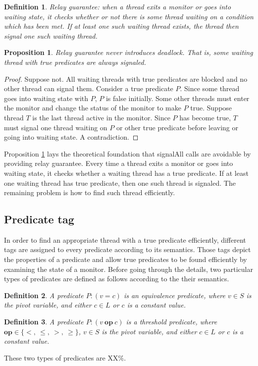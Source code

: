 \documentclass[preprint]{sigplanconf}
\newtheorem{definition}{Definition}
\newtheorem{proposition}{Proposition}
\begin{document}
\begin{definition}{Relay guarantee:}
    when a thread exits a monitor or goes into waiting state, it checks whether
    or not there is some thread waiting on a condition which has been met. If
    at least one such waiting thread exists, the thread then signal one such
    waiting thread.
\end{definition}
\begin{proposition} \label{pro:one}
    Relay guarantee never introduces deadlock. That is,
    some waiting thread with true predicates are always signaled. 
\end{proposition}
\begin{proof}
    Suppose not. All waiting threads with true predicates are blocked and 
    no other thread can signal them. Consider a true predicate $P$. Since some
    thread goes into waiting state with $P$, $P$ is false initially. Some 
    other threads must enter the monitor and change the status of the monitor 
    to make $P$ true. Suppose thread $T$ is the last thread active 
    in the monitor. Since $P$ has become true, $T$ must signal one thread
    waiting on $P$ or other true predicate before leaving or 
    going into waiting state. A contradiction. 
 \end{proof}

Proposition \ref{pro:one} lays the theoretical foundation that signalAll calls
are avoidable by providing relay guarantee. Every time a
thread exits a monitor or goes into waiting state, it checks whether a
waiting thread has a true predicate. If at least one waiting thread has true
predicate, then one such thread is signaled. The remaining problem is how to 
find such thread efficiently. 

\subsection{Predicate tag}
In order to find an appropriate thread with a true predicate efficiently, 
different tags are assigned to every predicate according to its semantics. 
Those tags depict the properties of a predicate and allow true predicates to be 
found efficiently by examining the state of a monitor. Before going through the 
details, two particular types of predicates are defined as follows according to
the their semantics. 
\begin{definition}
    A predicate $P: (v = c)$ is an equivalence predicate, where $v \in S$ is 
    the pivot variable, and either $c \in L$ or $c$ is a constant 
    value.
\end{definition}
\begin{definition}
   A predicate $P: (v\ \boldsymbol{op}\ c)$ is a threshold predicate, where 
   $\boldsymbol{op}
    \in \{<,\ \le,\ >,\ \ge\}$, $v \in S$ is the pivot variable, and 
    either $c \in L$ or $c$ is a constant value.
\end{definition}
These two types of predicates are XX\%. 
\end{document}
